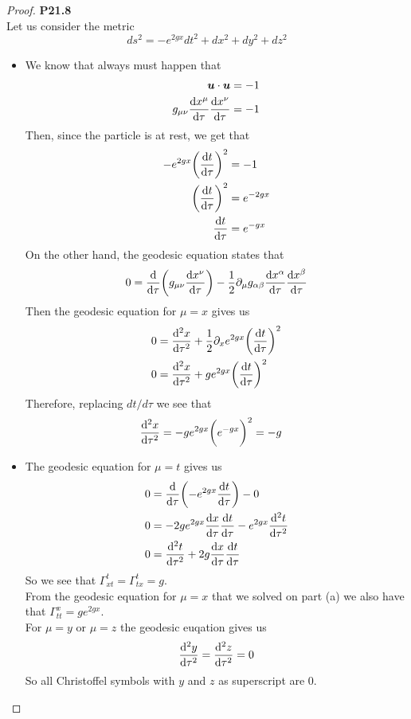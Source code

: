 \documentclass[11pt]{article}
\theoremstyle{definition}
\begin{document}
\cleardoublepage
\begin{proof}{\textbf{P21.8}}\\
Let us consider the metric
$$ds^2 = -e^{2gx}dt^2 + dx^2 + dy^2 + dz^2$$
\begin{itemize}
\item [\textbf{a.}] We know that always must happen that
\begin{align*}
    \bm{u} \cdot \bm{u} &= -1 \\
    g_{\mu\nu}\dv{x^{\mu}}{\tau}\dv{x^{\nu}}{\tau} &= -1
\end{align*}
Then, since the particle is at rest, we get that
\begin{align*}
    -e^{2gx}\bigg(\dv{t}{\tau}\bigg)^2 &= -1 \\
    \bigg(\dv{t}{\tau}\bigg)^2 &= e^{-2gx} \\
    \dv{t}{\tau} &= e^{-gx}
\end{align*}
On the other hand, the geodesic equation states that
\begin{align*}
0 = \dv{\tau}(g_{\mu\nu}\dv{x^\nu}{\tau})
- \frac{1}{2}\partial_\mu g_{\alpha\beta}\dv{x^\alpha}{\tau}\dv{x^\beta}{\tau}
\end{align*}
Then the geodesic equation for $\mu = x$ gives us
\begin{align*}
0 &= \dv[2]{x}{\tau} + \frac{1}{2}\partial_x e^{2gx}\bigg(\dv{t}{\tau}\bigg)^2 \\
0 &= \dv[2]{x}{\tau} + g e^{2gx}\bigg(\dv{t}{\tau}\bigg)^2 
\end{align*}
Therefore, replacing $dt/d\tau$ we see that
\begin{align*}
\dv[2]{x}{\tau} &= -g e^{2gx}\bigg(e^{-gx}\bigg)^2 = -g
\end{align*}

\item [\textbf{b.}] The geodesic equation for $\mu = t$ gives us
\begin{align*}
    0 &= \dv{\tau}(-e^{2gx}\dv{t}{\tau}) - 0 \\
    0 &= -2ge^{2gx}\dv{x}{\tau}\dv{t}{\tau} - e^{2gx}\dv[2]{t}{\tau} \\
    0 &= \dv[2]{t}{\tau} + 2g\dv{x}{\tau}\dv{t}{\tau}
\end{align*}
So we see that $\Gamma^t_{xt} = \Gamma^t_{tx} = g$.\\
From the geodesic equation for $\mu =x$ that we solved on part (a) we also have
that $\Gamma^x_{tt} = ge^{2gx}$.\\
For $\mu = y$ or $\mu = z$ the geodesic euqation gives us
\begin{align*}
    \dv[2]{y}{\tau} = \dv[2]{z}{\tau} = 0 
\end{align*} 
So all Christoffel symbols with $y$ and $z$ as superscript are 0.


\end{itemize}
\end{proof}
\end{document}
